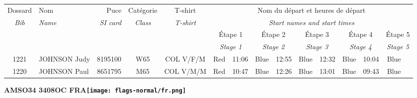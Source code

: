 \documentclass{report}
\begin{document}
  \begin{longtable}{|c|l|r|c|c|*{5}{cc|}}
    Dossard & Nom  & Puce    & Catégorie & T-shirt & \multicolumn{10}{c|}{Nom du départ et heures de départ} \\
    \itshape Bib     & \itshape Name & \itshape SI card & \itshape Class  & \itshape  T-shirt  & \multicolumn{10}{c|}{\itshape Start names and start times} \\
    \hline
    & & & & & \multicolumn{2}{c|}{Étape 1} & \multicolumn{2}{c|}{Étape 2} & \multicolumn{2}{c|}{Étape 3} & \multicolumn{2}{c|}{Étape 4} & \multicolumn{2}{c|}{Étape 5} \\
    & & & & & \multicolumn{2}{c|}{\itshape Stage 1} & \multicolumn{2}{c|}{\itshape Stage 2} & \multicolumn{2}{c|}{\itshape Stage 3} & \multicolumn{2}{c|}{\itshape Stage 4} & \multicolumn{2}{c|}{\itshape Stage 5} \\
    \hline
    1221 & JOHNSON Judy & 8195100 & W65 & COL V/F/M & Red & 11:06 & Blue & 12:55 & Blue & 12:32 & Blue & 10:04 & Blue &  \\
    1220 & JOHNSON Paul & 8651795 & M65 & COL V/M/M & Red & 10:47 & Blue & 12:26 & Blue & 13:01 & Blue & 09:43 & Blue &  \\
  \end{longtable}
\newpage
  \Huge \centering \bfseries AMSO34 3408OC FRA\normalfont \footnotesize \sffamily \hfill \texttt{[image: flags-normal/fr.png]} \newline 
\end{document}
